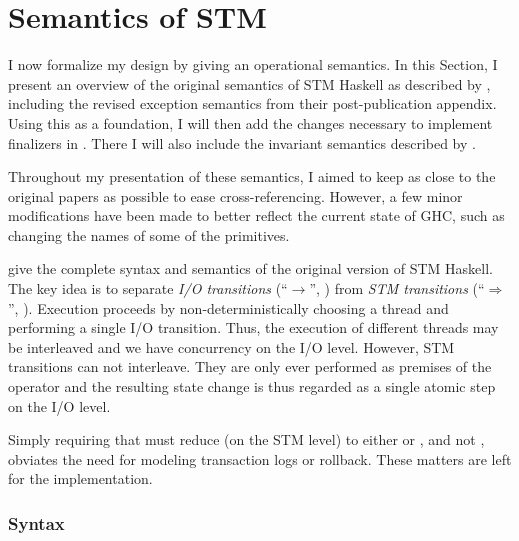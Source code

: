 \section{Semantics of STM}
\label{sec:stm-orig-semantics}

I now formalize my design by giving an operational semantics.
In this Section, I present an overview of the original semantics of STM Haskell as described by \textcite{harris-et-al-2005}, including the revised exception semantics from their post-publication appendix.
Using this as a foundation, I will then add the changes necessary to implement finalizers in .
There I will also include the invariant semantics described by \textcite{harris-peytonjones-2006}.

Throughout my presentation of these semantics, I aimed to keep as close to the original papers as possible to ease cross-referencing.
However, a few minor modifications have been made to better reflect the current state of GHC, such as changing the names of some of the primitives.

\bigskip
{} give the complete syntax and semantics of the original version of STM Haskell.
The key idea is to separate \emph{I/O transitions} (``$\rightarrow$'', ) from \emph{STM transitions} (``$\Rightarrow$'', ).
Execution proceeds by non-deterministically choosing a thread and performing a single I/O transition.
Thus, the execution of different threads may be interleaved and we have concurrency on the I/O level.
However, STM transitions can not interleave.
They are only ever performed as premises of the  operator and the resulting state change is thus regarded as a single atomic step on the I/O level.

Simply requiring that  must reduce (on the STM level) to either  or , and not , obviates the need for modeling transaction logs or rollback.
These matters are left for the implementation.

\subsubsection{Syntax}

